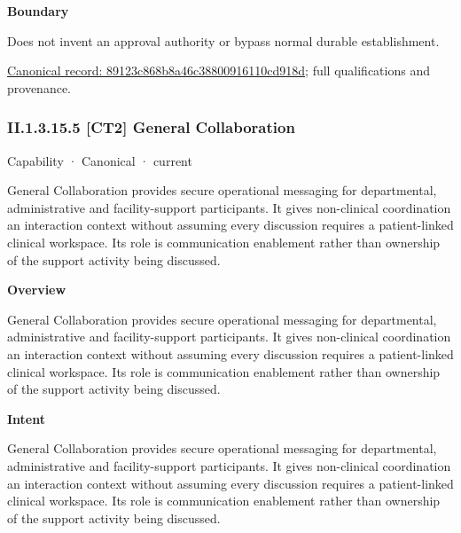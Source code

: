 \textbf{Boundary}



Does not invent an approval authority or bypass normal durable establishment.


{\footnotesize \href{../../../../continuum/strategy/capability/feature/89123c868b8a46c38800916110cd918d.md}{Canonical record: 89123c868b8a46c38800916110cd918d}; full qualifications and provenance.}\par
\subsubsection*{II.1.3.15.5 [CT2] General Collaboration}
\label{navigation:II.1.3.15.5}

\label{element:3bb740e6db284112b054905c0c6c80be}
{\small Capability · Canonical · current}\par

General Collaboration provides secure operational messaging for departmental, administrative and facility-support participants. It gives non-clinical coordination an interaction context without assuming every discussion requires a patient-linked clinical workspace. Its role is communication enablement rather than ownership of the support activity being discussed.



\textbf{Overview}



General Collaboration provides secure operational messaging for departmental, administrative and facility-support participants. It gives non-clinical coordination an interaction context without assuming every discussion requires a patient-linked clinical workspace. Its role is communication enablement rather than ownership of the support activity being discussed.



\textbf{Intent}



General Collaboration provides secure operational messaging for departmental, administrative and facility-support participants. It gives non-clinical coordination an interaction context without assuming every discussion requires a patient-linked clinical workspace. Its role is communication enablement rather than ownership of the support activity being discussed.



